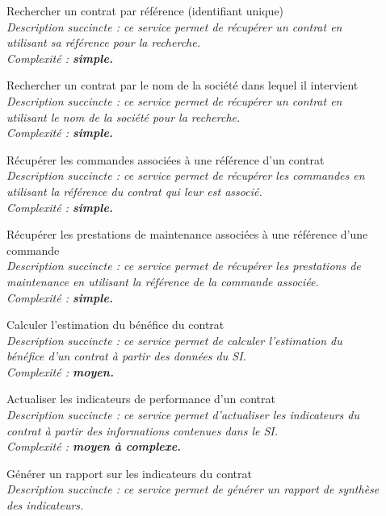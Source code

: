 \begin{description}
    \item[\textbullet] Rechercher un contrat par référence (identifiant unique) \\
        \it{Description succincte :} ce service permet de récupérer un contrat en utilisant sa référence pour la recherche. \\
        \it{Complexité :} \bf{simple}.
    \item[\textbullet] Rechercher un contrat par le nom de la société dans lequel il intervient \\
        \it{Description succincte :} ce service permet de récupérer un contrat en utilisant le nom de la société pour la recherche. \\
        \it{Complexité :} \bf{simple}.
    \item[\textbullet] Récupérer les commandes associées à une référence d’un contrat  \\
        \it{Description succincte :} ce service permet de récupérer les commandes en utilisant la référence du contrat qui leur est associé. \\
        \it{Complexité :} \bf{simple}.
    \item[\textbullet] Récupérer les prestations de maintenance associées à une référence d’une commande \\
        \it{Description succincte :} ce service permet de récupérer les prestations de maintenance en utilisant la référence de la commande associée.  \\
        \it{Complexité :} \bf{simple}.
    \item[\textbullet] Calculer l’estimation du bénéfice du contrat \\
        \it{Description succincte :} ce service permet de calculer l’estimation du bénéfice d’un contrat à partir des données du SI. \\
        \it{Complexité :} \bf{moyen}.
    \item[\textbullet] Actualiser les indicateurs de performance d’un contrat \\
        \it{Description succincte :} ce service permet d’actualiser les indicateurs du contrat à partir des informations contenues dans le SI. \\
        \it{Complexité :} \bf{moyen} à \bf{complexe}.
    \item[\textbullet] Générer un rapport sur les indicateurs du contrat \\
        \it{Description succincte :} ce service permet de générer un rapport de synthèse des indicateurs. \\

\end{description}
